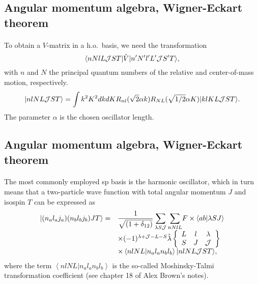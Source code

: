 \documentclass[%
twoside,                 %
final,                   %
10pt]{article}
\begin{document}
\subsection{Angular momentum algebra, Wigner-Eckart theorem}

\paragraph{}
To obtain a $V$-matrix in a h.o.~basis, we need  
the transformation
\[
     \langle nNlL{\cal J}ST\vert\hat{V}\vert n'N'l'L'{\cal J}S'T\rangle,
\]
with $n$ and $N$ the principal quantum numbers of the relative and
center-of-mass motion, respectively.
\[
   \vert nlNL{\cal J}ST\rangle= \int k^{2}K^{2}dkdKR_{nl}(\sqrt{2}\alpha k)
R_{NL}(\sqrt{1/2}\alpha K)
\vert klKL{\cal J}ST\rangle.
\]
The parameter $\alpha$ is the chosen oscillator length.



\subsection{Angular momentum algebra, Wigner-Eckart theorem}

\paragraph{}
The most commonly employed sp basis is the harmonic oscillator, which
in turn means that
a two-particle wave function with total angular momentum $J$
and isospin $T$
can be expressed as 
\[
\begin{array}{ll}
\vert (n_{a}l_{a}j_{a})(n_{b}l_{b}j_{b})JT\rangle =&
{\displaystyle
\frac{1}{\sqrt{(1+\delta_{12})}}
\sum_{\lambda S{\cal J}}\sum_{nNlL}}
F\times \langle ab|\lambda SJ \rangle\\
&\times (-1)^{\lambda +{\cal J}-L-S}\hat{\lambda}
\left\{\begin{array}{ccc}L&l&\lambda\\S&J&{\cal J}
\end{array}\right\}\\
&\times \left\langle nlNL| n_al_an_bl_b\right\rangle
\vert nlNL{\cal J}ST\rangle ,\end{array}
\label{eq:hoho}
\]
where the term
$\left\langle nlNL| n_al_an_bl_b\right\rangle$
is the so-called Moshinsky-Talmi transformation coefficient (see chapter 18 of Alex Brown's notes).
\end{document}
